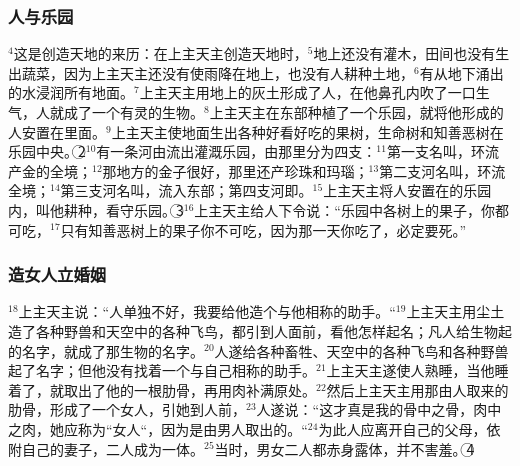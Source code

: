 \subsubsection{人与乐园}
$^{4}$这是创造天地的来历：在上主天主创造天地时，$^{5}$地上还没有灌木，田间也没有生出蔬菜，因为上主天主还没有使雨降在地上，也没有人耕种土地，$^{6}$有从地下涌出的水浸润所有地面。$^{7}$上主天主用地上的灰土形成了人，在他鼻孔内吹了一口生气，人就成了一个有灵的生物。$^{8}$上主天主在\UL[伊甸]东部种植了一个乐园，就将他形成的人安置在里面。$^{9}$上主天主使地面生出各种好看好吃的果树，生命树和知善恶树在乐园中央。\textcircled{2}$^{10}$有一条河由\UL[伊甸]流出灌溉乐园，由那里分为四支：$^{11}$第一支名叫\UL[丕雄]，环流产金的\UL[哈威拉]全境；$^{12}$那地方的金子很好，那里还产珍珠和玛瑙；$^{13}$第二支河名叫\UL[基红]，环流\UL[雇士]全境；$^{14}$第三支河名叫\UL[底格里斯]，流入\UL[亚述]东部；第四支河即\UL[幼发拉的]。$^{15}$上主天主将人安置在\UL[伊甸]的乐园内，叫他耕种，看守乐园。\textcircled{3}$^{16}$上主天主给人下令说：“乐园中各树上的果子，你都可吃，$^{17}$只有知善恶树上的果子你不可吃，因为那一天你吃了，必定要死。”


\subsubsection{造女人立婚姻}
$^{18}$上主天主说：“人单独不好，我要给他造个与他相称的助手。“$^{19}$上主天主用尘土造了各种野兽和天空中的各种飞鸟，都引到人面前，看他怎样起名；凡人给生物起的名字，就成了那生物的名字。$^{20}$人遂给各种畜牲、天空中的各种飞鸟和各种野兽起了名字；但他没有找着一个与自己相称的助手。$^{21}$上主天主遂使人熟睡，当他睡着了，就取出了他的一根肋骨，再用肉补满原处。$^{22}$然后上主天主用那由人取来的肋骨，形成了一个女人，引她到人前，$^{23}$人遂说：“这才真是我的骨中之骨，肉中之肉，她应称为“女人“，因为是由男人取出的。“$^{24}$为此人应离开自己的父母，依附自己的妻子，二人成为一体。$^{25}$当时，男女二人都赤身露体，并不害羞。\textcircled{4}


